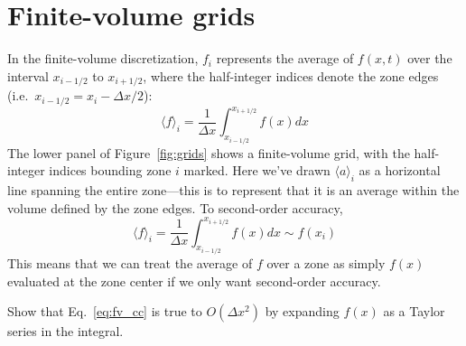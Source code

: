 \section{Finite-volume grids}

In the finite-volume discretization, $f_i$ represents the average of
$f(x,t)$ over the interval $x_{i-1/2}$ to $x_{i+1/2}$, where the
half-integer indices denote the zone edges (i.e.\ $x_{i-1/2} = x_i -
\Delta x/2$):
\begin{equation}
\label{eq:fv_cc-a}
\langle f\rangle_i = \frac{1}{\Delta x} \int_{x_{i-1/2}}^{x_{i+1/2}} f(x) dx 
\end{equation}
The lower panel of Figure~\ref{fig:grids} shows a finite-volume grid, with the half-integer indices bounding zone $i$ marked.
%
%
Here we've drawn $\langle a\rangle_i$ as a horizontal line spanning the entire zone---this 
is to represent that it is an average within the volume defined by the zone
edges.
%
To second-order accuracy,
\begin{equation}
\label{eq:fv_cc}
\langle f\rangle_i = \frac{1}{\Delta x} \int_{x_{i-1/2}}^{x_{i+1/2}} f(x) dx \sim f(x_i) 
\end{equation}
This means that we can treat the average of $f$ over a zone as simply $f(x)$
evaluated at the zone center if we only want second-order accuracy.

\begin{exercise}
{Show that Eq.~\ref{eq:fv_cc} is true to $O(\Delta x^2)$ by expanding
$f(x)$ as a Taylor series in the integral.}
\end{exercise}

